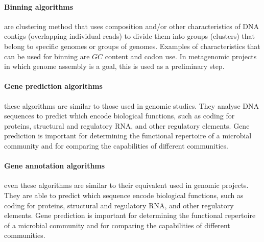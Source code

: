 \paragraph{Binning algorithms} are clustering method that uses composition and/or other characteristics of DNA contigs (overlapping individual reads) to divide them into groups (clusters) that belong to specific genomes or groups of genomes. Examples of characteristics that can be used for binning are $GC$ content and codon use. In metagenomic projects in which genome assembly is a goal, this is used as a preliminary step.\\

\paragraph{Gene prediction algorithms} these algorithms are similar to those used in genomic studies. They analyse DNA sequences to predict which encode biological functions, such as coding for proteins, structural and regulatory RNA, and other regulatory elements. Gene prediction is important for determining the functional repertoire of a microbial community and for comparing the capabilities of different communities.\\

\paragraph{Gene annotation algorithms} even these algorithms are similar to their equivalent used in genomic projects. They are able to predict which sequence encode biological functions, such as coding for proteins, structural and regulatory RNA, and other regulatory elements. Gene prediction is important for determining the functional repertoire of a microbial community and for comparing the capabilities of different communities.\\

